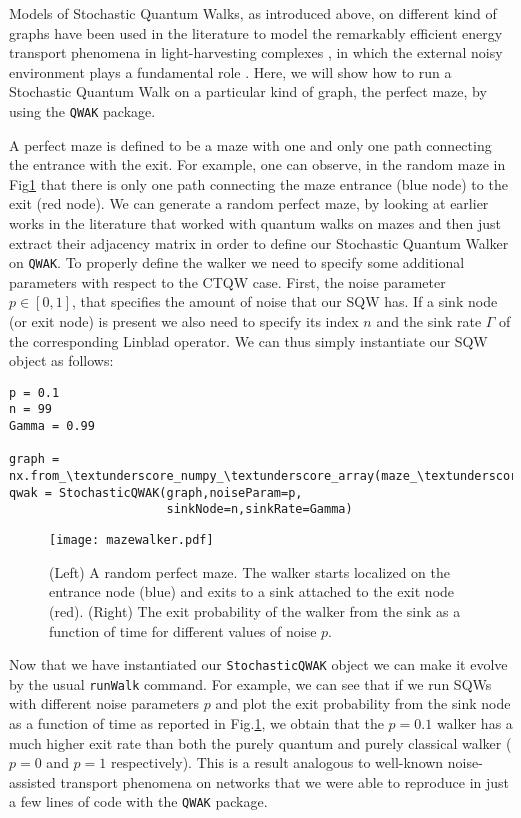 \documentclass[main.tex]{subfiles}
\begin{document}
Models of Stochastic Quantum Walks, as introduced above, on different kind of
graphs have been used in the literature to model the remarkably efficient
energy transport phenomena in light-harvesting complexes \cite{Caruso2009}, in
which the external noisy environment plays a fundamental role
\cite{Caruso2014}. Here, we will show how to run a Stochastic Quantum Walk on a
particular kind of graph, the perfect maze, by using the \texttt{QWAK} package.


A perfect maze is defined to be a maze with one and only one path connecting
the entrance with the exit. For example, one can observe, in the random maze in
Fig\ref{fig:mazewalker} that there is only one path connecting the maze
entrance (blue node) to the exit (red node). We can generate a random perfect
maze, by looking at earlier works in the literature \cite{Pozza2022,Caruso2016}
that worked with quantum walks on mazes and then just extract their adjacency
matrix in order to define our Stochastic Quantum Walker on  \texttt{QWAK}. To
properly define the walker we need to specify some additional parameters with
respect to the CTQW case. First, the noise parameter $p \in [0,1]$, that
specifies the amount of noise that our SQW has. If a sink node (or exit node)
is present we also need to specify its index $n$ and the sink rate $\Gamma$ of
the corresponding Linblad operator. We can thus simply instantiate our SQW
object as follows:

\begin{lstlisting}[style=code,escapeinside={__}]
p = 0.1
n = 99
Gamma = 0.99

graph = nx.from_\textunderscore_numpy_\textunderscore_array(maze_\textunderscore_graph.adjacency)
qwak = StochasticQWAK(graph,noiseParam=p,
                      sinkNode=n,sinkRate=Gamma)
\end{lstlisting}

\begin{figure}[!h]
    \centering
    \texttt{[image: mazewalker.pdf]}
    \caption{(Left) A random perfect maze. The walker starts localized on the entrance node (blue) and exits to a sink attached to the exit node (red). (Right) The exit probability of the walker from the sink as a function of time for different values of noise $p$.}
    \label{fig:mazewalker}
\end{figure}

Now that we have instantiated our \texttt{StochasticQWAK} object we can make it
evolve by the usual \texttt{runWalk} command. For example, we can see that if
we run SQWs with different noise parameters $p$ and plot the exit probability
from the sink node as a function of time as reported in
Fig.\ref{fig:mazewalker}, we obtain that the $p=0.1$ walker has a much higher
exit rate than both the purely quantum and purely classical walker ($p=0$ and
$p=1$ respectively). This is a result analogous to well-known noise-assisted
transport phenomena on networks \cite{Caruso2009, mohseni08} that we were able
to reproduce in just a few lines of code with the  \texttt{QWAK} package.
\end{document}

